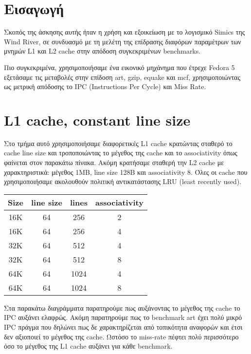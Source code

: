 \documentclass[a4paper,12pt]{article}
\begin{document}
\def\thesection {\roman{section}: }



\section{Εισαγωγή}
Σκοπός της άσκησης αυτής ήταν η χρήση και εξοικείωση με το λογισμικό Simics της
Wind River, σε συνδυασμό με τη μελέτη της επίδρασης διαφόρων παραμέτρων των
μνημών L1 και L2 cache στην απόδοση συγκεκριμένων benchmarks.

Πιο συγκεκριμένα, χρησιμοποιήσαμε ένα εικονικό μηχάνημα που έτρεχε Fedora 5
εξετάσαμε τις μεταβολές στην επίδοση art, gzip, equake και mcf,
χρησιμοποιώντας ως μετρική απόδοσης το IPC (Instructions Per Cycle) και Miss
Rate.


\section{L1 cache, constant line size}

Στο τμήμα αυτό χρησιμοποιήσαμε διαφορετικές L1 cache κρατώντας σταθερό το
cache line size και τροποποιώντας το μέγεθος της cache και το associativity
όπως φαίνεται στον παρακάτω πίνακα. Ακόμη κρατήσαμε σταθερή την L2 cache με
χαρακτηριστικά: μέγεθος 1ΜΒ, line size 128B και associativity 8. Όλες οι cache
που χρησιμοποιήσαμε ακολουθούν πολιτική αντικατάστασης LRU (least recently
used).

\begin{table}[H]
    \centering
    \begin{tabular}{c c c c}
        Size & line size & lines & associativity\\ 
        \hline
        \hline
        16K   & 64 &  256  & 2\\
        16K   & 64 &  256  & 4\\
        \hline
        32K   & 64 &  512  & 4\\
        32K   & 64 &  512  & 8\\
        \hline
        64K   & 64 &  1024 & 4\\
        64K   & 64 &  1024 & 8\\
    \end{tabular}
\end{table}

Στα παρακάτω διαγράμματα παρατηρούμε πως αυξάνοντας το μέγεθος της cache το
IPC αυξάνει ελαφρώς. Ακόμη παρατηρούμε πως το benchmark art έχει πολύ μικρό
IPC πράγμα που δηλώνει πως δε χαρακτηρίζεται από τοπικότητα αναφορών και έτσι
δεν αξιοποιεί το μέγεθος της cache. Ωστόσο το miss-rate πέφτει πολύ
περισσότερο όσο το μέγεθος της L1 cache αυξάνει για κάθε benchmark.
\end{document}
